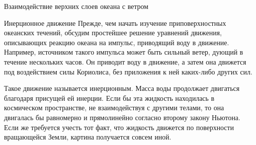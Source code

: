 \begin{chapter}{Взаимодействие верхних слоев океана с ветром}
\begin{section}{Инерционное движение}
Прежде, чем начать изучение приповерхностных океанских течений, 
обсудим простейшее решение уравнений движения, описывающих
реакцию океана на импульс, приводящий воду в движение. 
Например, источником такого импульса может быть сильный ветер, дующий в 
течение нескольких часов. Он приводит воду в движение, а затем она движется 
под воздействием силы Кориолиса, без приложения к ней каких-либо других сил. 
%

Такое движение называется инерционным. Масса воды продолжает двигаться 
благодаря присущей ей инерции. Если бы эта жидкость находилась в космическом
пространстве, не взаимодействуя с другими телами, то она двигалась бы 
равномерно и прямолинейно согласно второму закону Ньютона. Если же требуется
учесть тот факт, что жидкость движется по поверхности вращающейся Земли, 
картина получается совсем иной.
%


\end{section}
\end{chapter}
